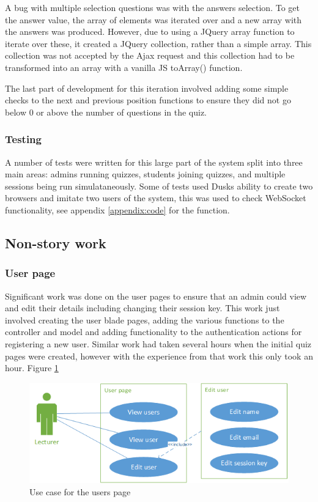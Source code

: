 A bug with multiple selection questions was with the answers selection. To get the answer value, the array of elements was iterated over and a new array with the answers was produced. However, due to using a JQuery array function to iterate over these, it created a JQuery collection, rather than a simple array. This collection was not accepted by the Ajax request and this collection had to be transformed into an array with a vanilla JS toArray() function.

The last part of development for this iteration involved adding some simple checks to the next and previous position functions to ensure they did not go below 0 or above the number of questions in the quiz.

\subsubsection{Testing}
A number of tests were written for this large part of the system split into three main areas: admins running quizzes, students joining quizzes, and multiple sessions being run simulataneously. Some of tests used Dusks ability to create two browsers and imitate two users of the system, this was used to check WebSocket functionality, see appendix \ref{appendix:code} for the function.
\newpage

\subsection{Non-story work}
\subsubsection{User page}
Significant work was done on the user pages to ensure that an admin could view and edit their details including changing their session key. This work just involved creating the user blade pages, adding the various functions to the controller and model and adding functionality to the authentication actions for registering a new user. Similar work had taken several hours when the initial quiz pages were created, however with the experience from that work this only took an hour. Figure \ref{fig:iter-5-users-use-case}

\begin{figure}
	\caption{Use case for the users page}
	\centerline{\includegraphics{Chapter2/Iter-5/iter-5-users-use-case}}
	\label{fig:iter-5-users-use-case}
\end{figure}

